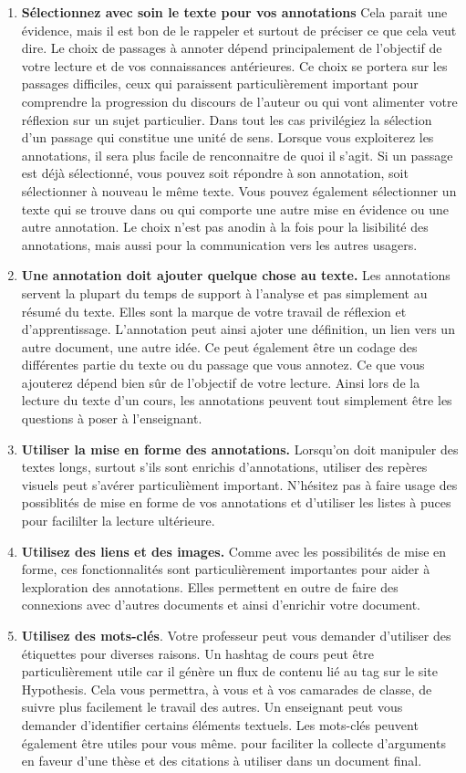 \documentclass[
]{book}
\begin{document}
\begin{enumerate}
\def\labelenumi{\arabic{enumi}.}
\item
  \textbf{Sélectionnez avec soin le texte pour vos annotations} Cela parait une évidence, mais il est bon de le rappeler et surtout de préciser ce que cela veut dire. Le choix de passages à annoter dépend principalement de l'objectif de votre lecture et de vos connaissances antérieures. Ce choix se portera sur les passages difficiles, ceux qui paraissent particulièrement important pour comprendre la progression du discours de l'auteur ou qui vont alimenter votre réflexion sur un sujet particulier. Dans tout les cas privilégiez la sélection d'un passage qui constitue une unité de sens. Lorsque vous exploiterez les annotations, il sera plus facile de renconnaitre de quoi il s'agit. Si un passage est déjà sélectionné, vous pouvez soit répondre à son annotation, soit sélectionner à nouveau le même texte. Vous pouvez également sélectionner un texte qui se trouve dans ou qui comporte une autre mise en évidence ou une autre annotation. Le choix n'est pas anodin à la fois pour la lisibilité des annotations, mais aussi pour la communication vers les autres usagers.
\item
  \textbf{Une annotation doit ajouter quelque chose au texte.} Les annotations servent la plupart du temps de support à l'analyse et pas simplement au résumé du texte. Elles sont la marque de votre travail de réflexion et d'apprentissage. L'annotation peut ainsi ajoter une définition, un lien vers un autre document, une autre idée. Ce peut également être un codage des différentes partie du texte ou du passage que vous annotez. Ce que vous ajouterez dépend bien sûr de l'objectif de votre lecture. Ainsi lors de la lecture du texte d'un cours, les annotations peuvent tout simplement être les questions à poser à l'enseignant.
\item
  \textbf{Utiliser la mise en forme des annotations.} Lorsqu'on doit manipuler des textes longs, surtout s'ils sont enrichis d'annotations, utiliser des repères visuels peut s'avérer particulièment important. N'hésitez pas à faire usage des possiblités de mise en forme de vos annotations et d'utiliser les listes à puces pour facililter la lecture ultérieure.
\item
  \textbf{Utilisez des liens et des images.} Comme avec les possibilités de mise en forme, ces fonctionnalités sont particulièrement importantes pour aider à lexploration des annotations. Elles permettent en outre de faire des connexions avec d'autres documents et ainsi d'enrichir votre document.
\item
  \textbf{Utilisez des mots-clés}. Votre professeur peut vous demander d'utiliser des étiquettes pour diverses raisons. Un hashtag de cours peut être particulièrement utile car il génère un flux de contenu lié au tag sur le site Hypothesis. Cela vous permettra, à vous et à vos camarades de classe, de suivre plus facilement le travail des autres. Un enseignant peut vous demander d'identifier certains éléments textuels. Les mots-clés peuvent également être utiles pour vous même. pour faciliter la collecte d'arguments en faveur d'une thèse et des citations à utiliser dans un document final.
\end{enumerate}
\end{document}
